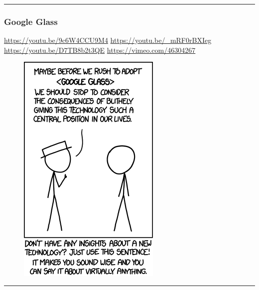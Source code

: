\documentclass[
  letterpaper,
  DIV=11,
  numbers=noendperiod,
  oneside]{scrartcl}
\begin{document}
\begin{center}\rule{0.5\linewidth}{0.5pt}\end{center}

\hypertarget{google-glass}{%
\subsubsection{Google Glass}\label{google-glass}}

\url{https://youtu.be/9c6W4CCU9M4} \url{https://youtu.be/_mRF0rBXIeg}
\url{https://youtu.be/D7TB8b2t3QE} \url{https://vimeo.com/46304267}

\begin{figure}

\href{https://www.explainxkcd.com/wiki/index.php/Category:Google_Glass}{\includegraphics{../img/insight.png}}

\end{figure}

\begin{center}\rule{0.5\linewidth}{0.5pt}\end{center}
\end{document}
